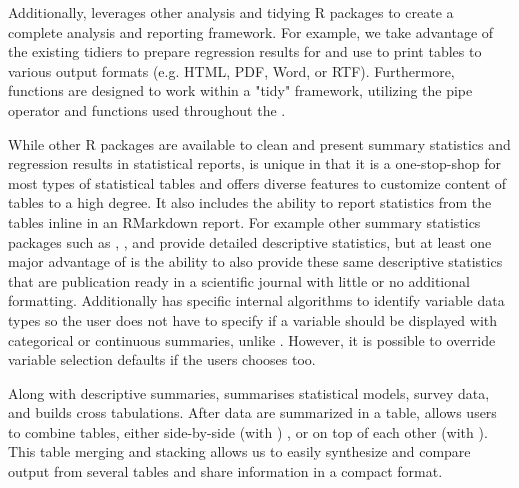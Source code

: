 Additionally,  leverages other analysis and tidying R packages to create a complete analysis and reporting framework.
For example, we take advantage of the existing  tidiers to prepare regression results for  and use  \citep{gt} to print  tables to various output formats (e.g. HTML, PDF, Word, or RTF).
Furthermore,  functions are designed to work within a "tidy" framework, utilizing the  pipe operator and  \citep{tidyselect} functions used throughout the  \citep{tidyverse}.

While other R packages are available to clean and present summary statistics and regression results in statistical reports,  is unique in that it is a one-stop-shop for most types of statistical tables and offers diverse features to customize content of tables to a high degree. It also includes the ability to report statistics from the tables inline in an RMarkdown report.
For example other summary statistics packages such as , , and  provide detailed descriptive statistics, but at least one major advantage of  is the ability to also provide these same descriptive statistics that are publication ready in a scientific journal with little or no additional formatting.
Additionally  has specific internal algorithms to identify variable data types so the user does not have to specify if a variable should be displayed with categorical or continuous summaries, unlike  .
However, it is possible to override  variable selection defaults if the users chooses too. 

Along with descriptive summaries,  summarises statistical models, survey data, and builds cross tabulations. 
After data are summarized in a table,  allows users to combine tables, either side-by-side (with ) , or on top of each other (with ). 
This table merging and stacking allows us to easily synthesize and compare output from several tables and share information in a compact format.   

